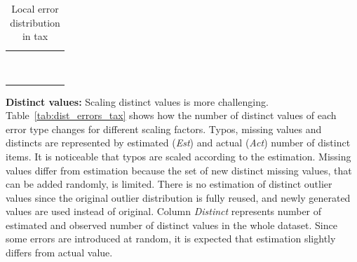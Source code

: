 \begin{table}[!t]
\caption{\label{tab:local_errors_tax} Local error distribution in tax}
\centering
\begin{tabular}{r|K|K|K|K|K}
\toprule
{} &  &  &  &  &   \\ \midrule
   &    &    &     &     &     \\
   &    &    &    &     &     \\
   &    &    &    &     &    \\
   &   &   &    &     &    \\
  &   &   &    &    &    \\
  &   &   &   &    &   \\
  &  &   &   &    &   \\
 &  &  &   &   &   \\
 &  &  &  &   &  \\
\bottomrule
\end{tabular}
\end{table}

\textbf{Distinct values:} 
Scaling distinct values is more challenging. 
Table~\ref{tab:dist_errors_tax} shows how the number of distinct values of each error type changes for different scaling factors.
Typos, missing values and distincts are represented by estimated (\textit{Est}) and actual (\textit{Act}) number of distinct items.
It is noticeable that typos are scaled according to the estimation.
Missing values differ from estimation because the set of new distinct missing values, that can be added randomly, is limited. %
There is no estimation of distinct outlier values since the original outlier distribution is fully reused, and newly generated values are used instead of original. 
Column \textit{Distinct} represents number of estimated and observed number of distinct values in the whole dataset.
Since some errors are introduced at random, it is expected that estimation slightly differs from actual value. 

